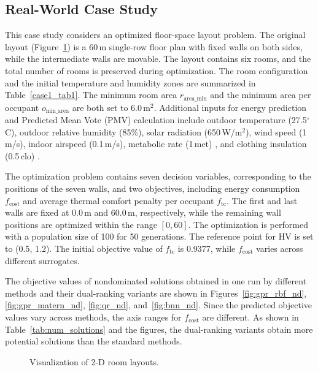 \documentclass{article}
\begin{document}
\subsection{Real-World Case Study}
This case study \cite{building_opt2} considers an optimized floor-space layout problem. The original layout (Figure~\ref{fig_case1_results}) is a 60\,m single-row floor plan with fixed walls on both sides, while the intermediate walls are movable. The layout contains six rooms, and the total number of rooms is preserved during optimization. The room configuration and the initial temperature and humidity zones are summarized in Table~\ref{case1_tab1}. The minimum room area $r_{\text{area\_min}}$ and the minimum area per occupant $o_\text{min\_area}$ are both set to 6.0\,m$^2$. Additional inputs for energy prediction and Predicted Mean Vote (PMV) calculation include outdoor temperature (27.5$^\circ$C), outdoor relative humidity (85\%), solar radiation (650\,W/m$^2$), wind speed (1\,m/s), indoor airspeed (0.1\,m/s), metabolic rate (1\,met) \cite{metabolic_rate}, and clothing insulation (0.5\,clo) \cite{thermal-comfort-pmv}. 

The optimization problem contains seven decision variables, corresponding to the positions of the seven walls, and two objectives, including energy consumption $f_{\text{cost}}$ and average thermal comfort penalty per occupant $f_{\text{tc}}$. The first and last walls are fixed at 0.0\,m and 60.0\,m, respectively, while the remaining wall positions are optimized within the range $[0,60]$. The optimization is performed with a population size of 100 for 50 generations. The reference point for HV is set to (0.5, 1.2). The initial objective value of $f_{\text{tc}}$ is 0.9377, while $f_{\text{cost}}$ varies across different surrogates. 

The objective values of nondominated solutions obtained in one run by different methods and their dual-ranking variants are shown in Figures~\ref{fig:gpr_rbf_nd}, \ref{fig:gpr_matern_nd}, \ref{fig:qr_nd}, and~\ref{fig:bnn_nd}. Since the predicted objective values vary across methods, the axis ranges for $f_{\text{cost}}$ are different. As shown in Table~\ref{tab:num_solutions} and the figures, the dual-ranking variants obtain more potential solutions than the standard methods.

\begin{figure}[htbp]
    \centering
    
    \caption{Visualization of 2-D room layouts.}
    \label{fig_case1_results}
\end{figure}
\end{document}
